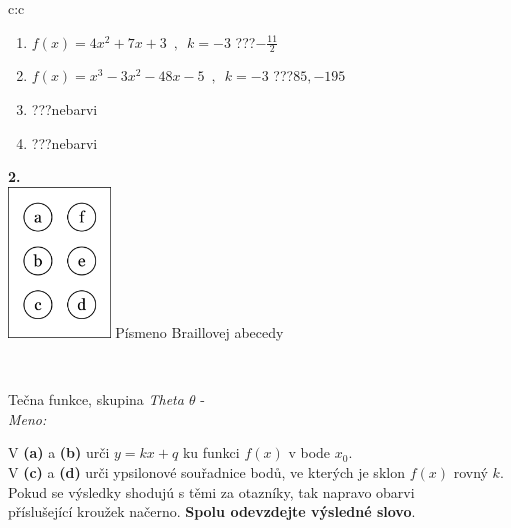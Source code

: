 \documentclass[10pt]{report}
\begin{document}
\begin{tabular}{c:c}
\begin{minipage}[c][104.5mm][t]{0.5\linewidth}
\begin{center}
\begin{minipage}{0.79\linewidth}
\begin{center}
\begin{varwidth}{\linewidth}
\begin{enumerate}
\item $f(x)=4x^2+7x+3\enspace , \enspace k=-3$\quad \dotfill\; ???\;\dotfill \quad $-\frac{11}{2}$
\item $f(x)=x^3-3x^2-48x-5\enspace , \enspace k=-3$\quad \dotfill\; ???\;\dotfill \quad $85 , -195$
\item \quad \dotfill\; ???\;\dotfill \quad nebarvi
\item \quad \dotfill\; ???\;\dotfill \quad nebarvi
\end{enumerate}
\end{varwidth}
\end{center}
\end{minipage}
\begin{minipage}{0.20\linewidth}
\begin{center}
{\Huge\bfseries 2.} \\[2mm]
\includegraphics[height=40mm]{../images/braille.png}
{\small Písmeno Braillovej abecedy}
\end{center}
\end{minipage}
\end{center}
\end{minipage}
\\ \hdashline
\begin{minipage}[c][104.5mm][t]{0.5\linewidth}
\begin{center}
\vspace{7mm}
{\huge Tečna funkce, skupina \textit{Theta $\theta$} -}\\[5mm]
\textit{Meno:}\phantom{xxxxxxxxxxxxxxxxxxxxxxxxxxxxxxxxxxxxxxxxxxxxxxxxxxxxxxxxxxxxxxxxx}\\[5mm]
\begin{minipage}{0.95\linewidth}
\begin{center}
V \textbf{(a)} a \textbf{(b)} urči  $y = kx + q$ ku funkci $f(x)$ v bode $x_0$.\\V \textbf{(c)} a \textbf{(d)} urči ypsilonové souřadnice bodů, ve kterých je sklon $f(x)$ rovný $k$.\\Pokud se výsledky shodujú s těmi za otazníky, tak napravo obarvi\\příslušející kroužek načerno. \textbf{Spolu odevzdejte výsledné slovo}.

\end{center}
\end{minipage}
\end{center}
\end{minipage}
\end{tabular}
\end{document}

